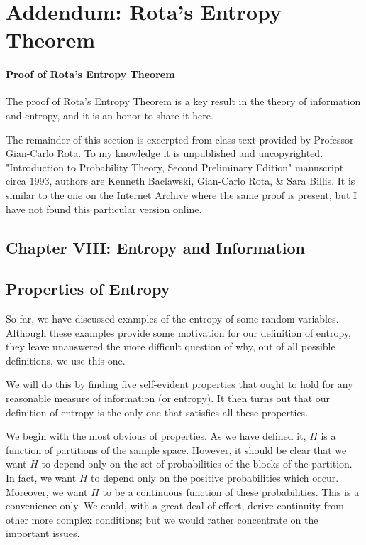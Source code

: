 \documentclass{report}
\begin{document}
\newpage

\section*{Addendum: Rota's Entropy Theorem}

\paragraph{Proof of Rota's Entropy Theorem}
The proof of Rota's Entropy Theorem is a key result in the theory of information and entropy, and it is an honor to share it here.

The remainder of this section is excerpted from class text provided by Professor Gian-Carlo Rota. To my knowledge it is unpublished and uncopyrighted. "Introduction to Probability Theory, Second Preliminary Edition" manuscript circa 1993, authors are Kenneth Baclawski, Gian-Carlo Rota, \& Sara Billis. It is similar to the one on the Internet Archive\cite{RotaBaclawski} where the same proof is present, but I have not found this particular version online. 
\medskip
\medskip

\subsection*{Chapter VIII: Entropy and Information}
\normalsize
\subsection*{Properties of Entropy}

So far, we have discussed examples of the entropy of some random variables. Although these examples provide some motivation for our definition of entropy, they leave unanswered the more difficult question of why, out of all possible definitions, we use this one.

We will do this by finding five self-evident properties that ought to hold for any reasonable measure of information (or entropy). It then turns out that our definition of entropy is the only one that satisfies all these properties.

We begin with the most obvious of properties. As we have defined it, \( H \) is a function of partitions of the sample space. However, it should be clear that we want \( H \) to depend only on the set of probabilities of the blocks of the partition. In fact, we want \( H \) to depend only on the positive probabilities which occur. Moreover, we want \( H \) to be a continuous function of these probabilities. This is a convenience only. We could, with a great deal of effort, derive continuity from other more complex conditions; but we would rather concentrate on the important issues. 
\end{document}
